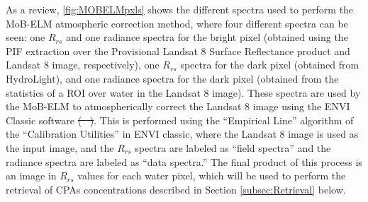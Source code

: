 \documentclass[onecolumn,3p,letterpaper]{elsarticle}
\providecommand{\DIFaddtex}[1]{{\protect\color{blue}\uwave{#1}}} %
\providecommand{\DIFdeltex}[1]{{\protect\color{red}\sout{#1}}}                      %
\providecommand{\DIFaddbegin}{} %
\providecommand{\DIFaddend}{} %
\providecommand{\DIFdelbegin}{} %
\providecommand{\DIFdelend}{} %
\providecommand{\DIFadd}[1]{\texorpdfstring{\DIFaddtex{#1}}{#1}} %
\providecommand{\DIFdel}[1]{\texorpdfstring{\DIFdeltex{#1}}{}} %
\begin{document}
As a review, \autoref{fig:MOBELMpxls} shows the different spectra used to perform the MoB-ELM atmospheric correction method, where four different spectra can be seen: one $R_{rs}$ and one radiance spectra for the bright pixel (obtained using the PIF extraction over the Provisional Landsat 8 Surface Reflectance product and Landsat 8 image, respectively), one $R_{rs}$ spectra for the dark pixel (obtained from HydroLight), and one radiance spectra for the dark pixel (obtained from the statistics of a ROI over water in the Landsat 8 image). These spectra are used by the MoB-ELM to atmospherically correct the Landsat 8 image using the ENVI Classic software \DIFdelbegin \DIFdel{(\mbox{%
\cite{ENVIUserGuide}}%
)}\DIFdelend \DIFaddbegin \DIFadd{\mbox{%
\citep{ENVIUserGuide}}%
}\DIFaddend . This is performed using the ``Empirical Line'' algorithm of the ``Calibration Utilities'' in ENVI classic, where the Landsat 8 image is used as the input image, and the $R_{rs}$ spectra are labeled as ``field spectra'' and the radiance spectra are labeled as ``data spectra.'' The final product of this process is an image in $R_{rs}$ values for each water pixel, which will be used to perform the retrieval of CPAs concentrations described in Section \ref{subsec:Retrieval} below. 
\DIFdelbegin %

\DIFdelend %
\end{document}
